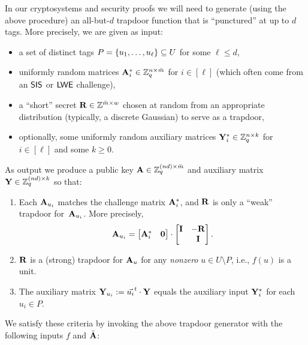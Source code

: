 In our cryptosystems and security proofs we will need to generate
(using the above procedure) an all-but-$d$ trapdoor function that is
``punctured'' at up to $d$ tags.  More precisely, we are given as
input:
\begin{itemize}[itemsep=0pt]
\item a set of distinct tags $P = \{{u_{1}, \ldots, u_{\ell}}\}
  \subseteq U$ for some $\ell \leq d$,
\item uniformly random matrices $\mathbf{A}^{*}_{i} \in \mathbb{Z}_q^{n \times
    \bar{m}}$ for $i \in [\ell]$ (which often come from an $\mathsf{SIS}$ or
  $\mathsf{LWE}$ challenge),
\item  a ``short'' secret
$\mathbf{R} \in \mathbb{Z}^{\bar{m} \times w}$ chosen at random from an appropriate
distribution (typically, a discrete Gaussian) to serve as a trapdoor,
\item optionally, some uniformly random auxiliary matrices
  $\mathbf{Y}^{*}_{i} \in \mathbb{Z}_q^{n \times k}$ for $i \in [\ell]$ and some $k
  \geq 0$.
\end{itemize}
As output we produce a public key $\mathbf{A} \in \mathbb{Z}_q^{(nd) \times
  \bar{m}}$ and auxiliary
matrix $\mathbf{Y} \in \mathbb{Z}_q^{(nd) \times k}$ so that:
\begin{enumerate}[itemsep=0pt]
\item \label{item:punctured} Each $\mathbf{A}_{u_{i}}$ matches the
  challenge matrix $\mathbf{A}^{*}_{i}$, and $\mathbf{R}$ is only a ``weak''
  trapdoor for~$\mathbf{A}_{u_{i}}$.  More precisely, \[ \mathbf{A}_{u_{i}} =
  \begin{bmatrix}
    \mathbf{A}^{*}_{i} & \mathbf{0}
  \end{bmatrix}
  \cdot \begin{bmatrix} \mathbf{I} & -\mathbf{R} \\ & \mathbf{I} \end{bmatrix}. \]
  
\item \label{item:trapdoor} $\mathbf{R}$ is a (strong) trapdoor for
  $\mathbf{A}_{u}$ for any \emph{nonzero} $u \in U \setminus P$, i.e.,
  $f(u)$ is a unit.

\item \label{item:outputs} The auxiliary matrix $\mathbf{Y}_{u_{i}} :=
  \vec{u_{i}}^{t} \cdot \mathbf{Y}$ equals the auxiliary input
  $\mathbf{Y}^{*}_{i}$ for each $u_{i} \in P$.
\end{enumerate}
We satisfy these criteria by invoking the above trapdoor generator
with the following inputs $f$ and $\bar{\mathbf{A}}$:
